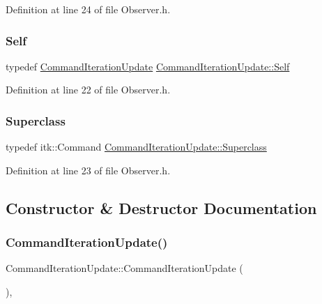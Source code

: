 Definition at line 24 of file Observer.\+h.

\mbox{\label{class_command_iteration_update_a82da0970ef8c14141f85f3465f08242e}} 
\subsubsection{\texorpdfstring{Self}{Self}}
{\footnotesize\ttfamily typedef \hyperlink{class_command_iteration_update}{Command\+Iteration\+Update} \hyperlink{class_command_iteration_update_a82da0970ef8c14141f85f3465f08242e}{Command\+Iteration\+Update\+::\+Self}}



Definition at line 22 of file Observer.\+h.

\mbox{\label{class_command_iteration_update_a7321e36a5179cac3cf6dc00de2d5f494}} 
\subsubsection{\texorpdfstring{Superclass}{Superclass}}
{\footnotesize\ttfamily typedef itk\+::\+Command \hyperlink{class_command_iteration_update_a7321e36a5179cac3cf6dc00de2d5f494}{Command\+Iteration\+Update\+::\+Superclass}}



Definition at line 23 of file Observer.\+h.



\subsection{Constructor \& Destructor Documentation}
\mbox{\label{class_command_iteration_update_a3b6dc4b6e947779a656ce69152377a70}} 
\subsubsection{\texorpdfstring{Command\+Iteration\+Update()}{CommandIterationUpdate()}}
{\footnotesize\ttfamily Command\+Iteration\+Update\+::\+Command\+Iteration\+Update (\begin{DoxyParamCaption}{ }\end{DoxyParamCaption})\hspace{0.3cm}{\ttfamily [inline]}, {\ttfamily [protected]}}



